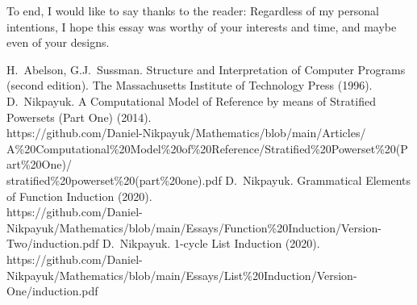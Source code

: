 \documentclass[twoside]{article}
\begin{document}
To end, I would like to say thanks to the reader: Regardless of my personal intentions, I hope this essay was worthy of your
interests and time, and maybe even of your designs.

\vfill

\begin{thebibliography}{99}
 H.~Abelson, G.J.~Sussman. Structure and Interpretation of Computer Programs (second edition).
               The Massachusetts Institute of Technology Press (1996).
 D.~Nikpayuk. A Computational Model of Reference by means of Stratified Powersets (Part One) (2014).\\
    https://github.com/Daniel-Nikpayuk/Mathematics/blob/main/Articles/\\
    A\%20Computational\%20Model\%20of\%20Reference/Stratified\%20Powerset\%20(Part\%20One)/\\
    stratified\%20powerset\%20(part\%20one).pdf
 D.~Nikpayuk. Grammatical Elements of Function Induction (2020).\\
    https://github.com/Daniel-Nikpayuk/Mathematics/blob/main/Essays/Function\%20Induction/Version-Two/induction.pdf
 D.~Nikpayuk. 1-cycle List Induction (2020).\\
    https://github.com/Daniel-Nikpayuk/Mathematics/blob/main/Essays/List\%20Induction/Version-One/induction.pdf
\end{thebibliography}
\end{document}
